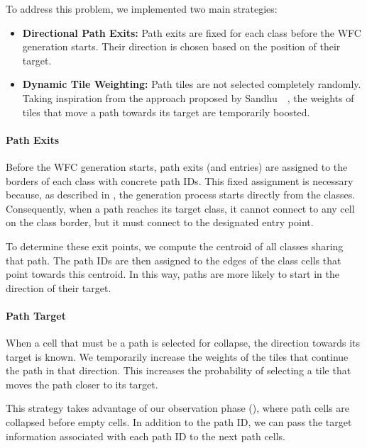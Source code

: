 \documentclass[../../main.tex]{subfiles}
\begin{document}
To address this problem, we implemented two main strategies:

\begin{itemize}
    \item \textbf{Directional Path Exits:} Path exits are fixed for each class before the WFC generation starts. Their direction is chosen based on the position of their target.
    \item \textbf{Dynamic Tile Weighting:} Path tiles are not selected completely randomly. Taking inspiration from the approach proposed by Sandhu~\etal~, the weights of tiles that move a path towards its target are temporarily boosted.
\end{itemize}

\paragraph{Path Exits}

Before the WFC generation starts, path exits (and entries) are assigned to the borders of each class with concrete path IDs. This fixed assignment is necessary because, as described in , the generation process starts directly from the classes. Consequently, when a path reaches its target class, it cannot connect to any cell on the class border, but it must connect to the designated entry point. 

To determine these exit points, we compute the centroid of all classes sharing that path. The path IDs are then assigned to the edges of the class cells that point towards this centroid. In this way, paths are more likely to start in the direction of their target.

\paragraph{Path Target}

When a cell that must be a path is selected for collapse, the direction towards its target is known. We temporarily increase the weights of the tiles that continue the path in that direction. This increases the probability of selecting a tile that moves the path closer to its target.

This strategy takes advantage of our observation phase (), where path cells are collapsed before empty cells. In addition to the path ID, we can pass the target information associated with each path ID to the next path cells.
\end{document}
